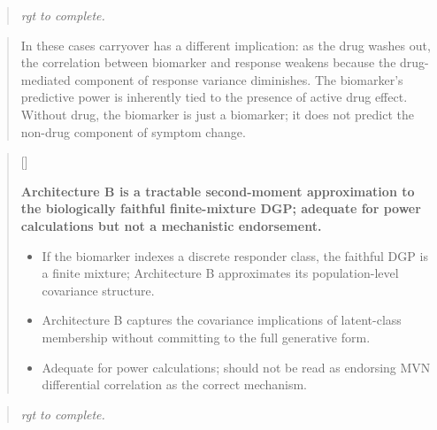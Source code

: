 \documentclass[
  11pt,
]{article}
\newcounter{pgraph}
\newenvironment{bullets}{%
  \stepcounter{pgraph}%
  \begin{quote}\small\sffamily\color[gray]{0.30}%
  {\normalfont\scriptsize\color[gray]{0.58}[\thepgraph]\enspace}}{%
  \end{quote}}
\newenvironment{rgt}{%
  \begin{quote}\small\itshape\color[RGB]{20,60,160}}{%
  \end{quote}}
\newenvironment{orig}{%
  \begin{quote}\normalsize\color[gray]{0.55}}{%
  \end{quote}}
\begin{document}
\begin{rgt}
rgt to complete.

\end{rgt}

\begin{orig}
In these cases carryover has a different implication: as the drug washes
out, the correlation between biomarker and response weakens because the
drug-mediated component of response variance diminishes. The biomarker's
predictive power is inherently tied to the presence of active drug
effect. Without drug, the biomarker is just a biomarker; it does not
predict the non-drug component of symptom change.

\end{orig}

\begin{bullets}

\textbf{Architecture B is a tractable second-moment
approximation to the biologically faithful finite-mixture DGP;
adequate for power calculations but not a mechanistic
endorsement.}

\begin{itemize}\setlength{\itemsep}{2pt}\setlength{\parskip}{0pt}
\item If the biomarker indexes a discrete responder class, the
  faithful DGP is a finite mixture; Architecture B approximates
  its population-level covariance structure.
\item Architecture B captures the covariance implications of
  latent-class membership without committing to the full
  generative form.
\item Adequate for power calculations; should not be read as
  endorsing MVN differential correlation as the correct
  mechanism.
\end{itemize}

\end{bullets}

\begin{rgt}
rgt to complete.

\end{rgt}
\end{document}
